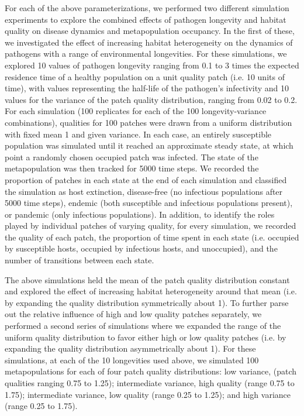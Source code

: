 \documentclass{article}
\begin{document}
For each of the above parameterizations, we performed two different simulation experiments to explore the combined effects of pathogen longevity and habitat quality on disease dynamics and metapopulation occupancy.  In the first of these, we investigated the effect of increasing habitat heterogeneity on the dynamics of pathogens with a range of environmental longevities.  For these simulations, we explored 10 values of pathogen longevity ranging from 0.1 to 3 times the expected residence time of a healthy population on a unit quality patch (i.e. 10 units of time), with values representing the half-life of the pathogen's infectivity and 10 values for the variance of the patch quality distribution, ranging from 0.02 to 0.2.  For each simulation (100 replicates for each of the 100 longevity-variance combinations), qualities for 100 patches were drawn from a uniform distribution with fixed mean 1 and given variance. In each case, an entirely susceptible population was simulated until it reached an approximate steady state, at which point a randomly chosen occupied patch was infected.  The state of the metapopulation was then tracked for 5000 time steps.  We recorded the proportion of patches in each state at the end of each simulation and classified the simulation as host extinction, disease-free (no infectious populations after 5000 time steps), endemic (both susceptible and infectious populations present), or pandemic (only infectious populations).  In addition, to identify the roles played by individual patches of varying quality, for every simulation, we recorded the quality of each patch, the proportion of time spent in each state (i.e. occupied by susceptible hosts, occupied by infectious hosts, and unoccupied), and the number of transitions between each state.  

The above simulations held the mean of the patch quality distribution constant and explored the effect of increasing habitat heterogeneity around that mean (i.e. by expanding the quality distribution symmetrically about 1).  To further parse out the relative influence of high and low quality patches separately, we performed a second series of simulations where we expanded the range of the uniform quality distribution to favor either high or low quality patches (i.e. by expanding the quality distribution asymmetrically about 1).  For these simulations, at each of the 10 longevities used above, we simulated 100 metapopulations for each of four patch quality distributions: low variance, (patch qualities ranging 0.75 to 1.25); intermediate variance, high quality (range 0.75 to 1.75); intermediate variance, low quality (range 0.25 to 1.25); and high variance (range 0.25 to 1.75). 
\end{document}
